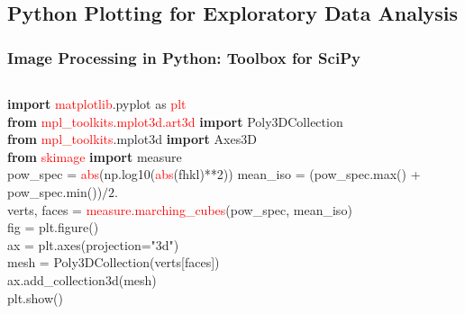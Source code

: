 \documentclass[]{beamer}
\begin{document}
\subsection{Python Plotting for Exploratory Data Analysis}%
\begin{frame}
\frametitle{Image Processing in Python: Toolbox for SciPy}
    \begin{columns}
    \begin{column}{0.65\textwidth}
            \ttfamily\scriptsize
            {\bf import} \textcolor{red}{matplotlib}.pyplot as \textcolor{red}{plt}\\
            {\bf from} \textcolor{red}{mpl\_toolkits.mplot3d.art3d} {\bf import} Poly3DCollection\\
            {\bf from} \textcolor{red}{mpl\_toolkits}.mplot3d {\bf import} Axes3D \\
            {\bf from} \textcolor{red}{skimage} {\bf import} measure\\
            \vfill
            pow\_spec = \textcolor{red}{abs}(np.log10(\textcolor{red}{abs}(fhkl)**2))
            mean\_iso = (pow\_spec.max() + pow\_spec.min())$/2.$\\
            verts, faces = \textcolor{red}{measure.marching\_cubes}(pow\_spec, mean\_iso)\\
            fig = plt.figure()\\ %
            ax = plt.axes(projection="3d")\\
            mesh = Poly3DCollection(verts[faces])\\%
            ax.add\_collection3d(mesh)\\
            plt.show()


\end{column}
\end{columns}
\end{frame}
\end{document}
